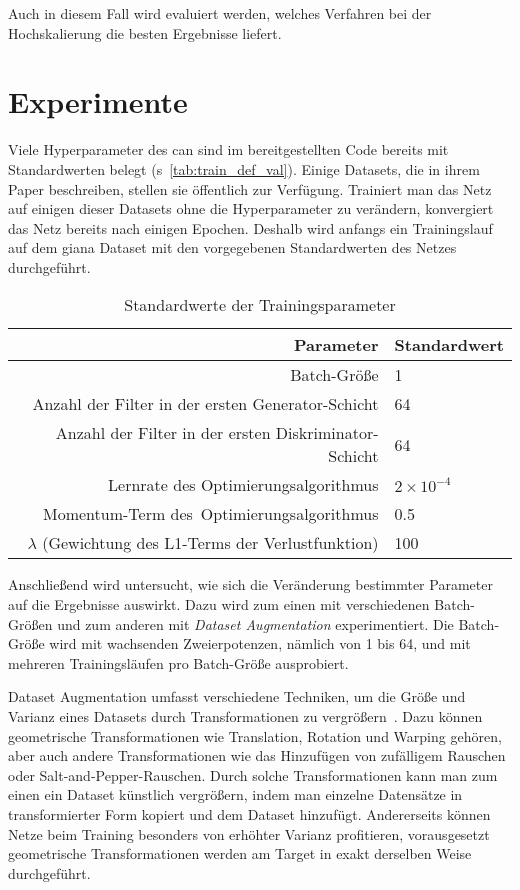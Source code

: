 Auch in diesem Fall wird evaluiert werden, welches Verfahren bei der Hochskalierung die besten Ergebnisse liefert.



\section{Experimente}

Viele Hyperparameter des \gls{can} sind im bereitgestellten Code bereits mit Standardwerten belegt (s~\autoref{tab:train_def_val}).
Einige Datasets, die \citeauthor{Isola.2017} in ihrem Paper beschreiben, stellen sie öffentlich zur Verfügung.
Trainiert man das Netz auf einigen dieser Datasets ohne die Hyperparameter zu verändern, konvergiert das Netz bereits nach einigen Epochen.
Deshalb wird anfangs ein Trainingslauf auf dem \gls{giana} Dataset mit den vorgegebenen Standardwerten des Netzes durchgeführt.

\begin{table}
	\centering
	\caption{Standardwerte der Trainingsparameter}
	\label{tab:train_def_val}
	\begin{tabular}{rl} 
		\toprule
		Parameter & Standardwert \\ 
		\midrule
		Batch-Größe & 1 \\
		Anzahl der Filter in der ersten Generator-Schicht & 64 \\
		Anzahl der Filter in der ersten Diskriminator-Schicht & 64 \\
		Lernrate des Optimierungsalgorithmus & $ 2 \times 10^{-4} $ \\
		Momentum-Term des~Optimierungsalgorithmus & 0.5 \\
		$ \lambda $ (Gewichtung des L1-Terms der Verlustfunktion) & 100 \\
		\bottomrule
	\end{tabular}
\end{table}

Anschließend wird untersucht, wie sich die Veränderung bestimmter Parameter auf die Ergebnisse auswirkt.
Dazu wird zum einen mit verschiedenen Batch-Größen und zum anderen mit \emph{Dataset Augmentation} experimentiert.
Die Batch-Größe wird mit wachsenden Zweierpotenzen, nämlich von 1 bis 64, und mit mehreren Trainingsläufen pro Batch-Größe ausprobiert.

Dataset Augmentation umfasst verschiedene Techniken, um die Größe und Varianz eines Datasets durch Transformationen zu vergrößern~\cite{Goodfellow.2016}.
Dazu können geometrische Transformationen wie Translation, Rotation und Warping gehören, aber auch andere Transformationen wie das Hinzufügen von zufälligem Rauschen oder Salt-and-Pepper-Rauschen.
Durch solche Transformationen kann man zum einen ein Dataset künstlich vergrößern, indem man einzelne Datensätze in transformierter Form kopiert und dem Dataset hinzufügt.
Andererseits können Netze beim Training besonders von erhöhter Varianz profitieren, vorausgesetzt geometrische Transformationen werden am Target in exakt derselben Weise durchgeführt.

